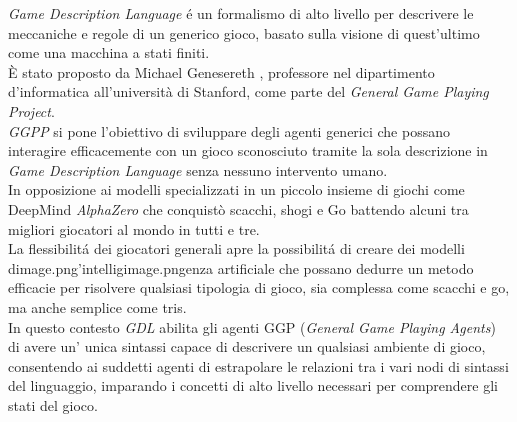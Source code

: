 \textit{Game Description Language} é un formalismo di alto livello per descrivere 
le meccaniche e regole di un generico gioco,
basato sulla visione di quest'ultimo come una macchina a stati finiti. \\
È stato proposto da Michael Genesereth \cite{GDLSpecification}, professore nel dipartimento d'informatica
all'università di Stanford, come parte del \textit{General Game Playing Project}. \\ 
\textit{GGPP} si pone l'obiettivo di sviluppare degli agenti generici che possano interagire efficacemente
con un gioco sconosciuto tramite la sola descrizione in \textit{Game Description Language} 
senza nessuno intervento umano. \\
In opposizione ai modelli specializzati in un piccolo insieme di giochi come 
DeepMind \textit{AlphaZero} \cite{AlphaZero} che conquistò scacchi, 
shogi e Go battendo alcuni tra migliori giocatori al mondo in tutti e tre. \\
La flessibilitá dei giocatori generali apre la possibilitá di creare dei modelli dimage.png'intelligimage.pngenza artificiale 
che possano dedurre un metodo efficacie per risolvere qualsiasi tipologia di gioco,
sia complessa come scacchi e go, ma anche semplice come tris. \\
In questo contesto \textit{GDL} abilita gli agenti GGP (\textit{General Game Playing Agents}) di avere un' 
unica sintassi capace di descrivere un qualsiasi ambiente di gioco, consentendo 
ai suddetti agenti di estrapolare le relazioni tra i vari nodi di sintassi del linguaggio,
imparando i concetti di alto livello necessari per comprendere gli stati del gioco.

